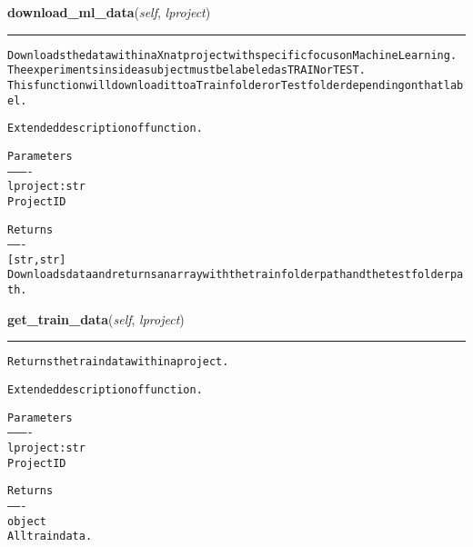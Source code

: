     \label{source:Xnat:Xnat:download_ml_data}

    \vspace{0.5ex}

\hspace{.8\funcindent}\begin{boxedminipage}{\funcwidth}

    \raggedright \textbf{download\_ml\_data}(\textit{self}, \textit{lproject})

    \vspace{-1.5ex}

    \rule{\textwidth}{0.5\fboxrule}
\setlength{\parskip}{2ex}
\begin{alltt}

Downloads the data within a Xnat project with specific focus on Machine Learning.
The experiments inside a subject must be labeled as TRAIN or TEST. 
This function will download it to a Train folder or Test folder depending on that label.

Extended description of function.

Parameters
----------
lproject : str
    Project ID

Returns
-------
[str, str]
    Downloads data and returns an array with the train folder path and the test folder path.
\end{alltt}

\setlength{\parskip}{1ex}
    \end{boxedminipage}

    \label{source:Xnat:Xnat:get_train_data}

    \vspace{0.5ex}

\hspace{.8\funcindent}\begin{boxedminipage}{\funcwidth}

    \raggedright \textbf{get\_train\_data}(\textit{self}, \textit{lproject})

    \vspace{-1.5ex}

    \rule{\textwidth}{0.5\fboxrule}
\setlength{\parskip}{2ex}
\begin{alltt}

Returns the train data within a project.

Extended description of function.

Parameters
----------
lproject : str
    Project ID

Returns
-------
object
    All train data.
\end{alltt}

\setlength{\parskip}{1ex}
    \end{boxedminipage}

